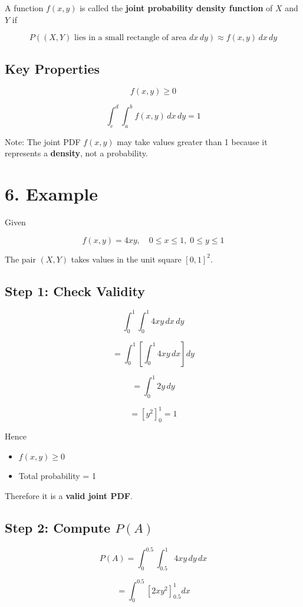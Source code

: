 \documentclass[12pt]{article}
\begin{document}
A function $f(x,y)$ is called the \textbf{joint probability density function} of $X$ and $Y$ if

\[
P((X,Y) \text{ lies in a small rectangle of area } dx\,dy)
\approx f(x,y)\,dx\,dy
\]

\subsection*{Key Properties}

\[
f(x,y) \ge 0
\]

\[
\int_c^d \int_a^b f(x,y)\,dx\,dy = 1
\]

Note: The joint PDF $f(x,y)$ may take values greater than 1 because it represents a \textbf{density}, not a probability.

\section*{6. Example}

Given

\[
f(x,y) = 4xy, \quad 0 \le x \le 1,\; 0 \le y \le 1
\]

The pair $(X,Y)$ takes values in the unit square $[0,1]^2$.

\subsection*{Step 1: Check Validity}

\[
\int_0^1 \int_0^1 4xy\,dx\,dy
\]

\[
= \int_0^1 \left[\int_0^1 4xy\,dx \right] dy
\]

\[
= \int_0^1 2y\,dy
\]

\[
= [y^2]_0^1 = 1
\]

Hence

\begin{itemize}
\item $f(x,y) \ge 0$
\item Total probability = 1
\end{itemize}

Therefore it is a \textbf{valid joint PDF}.

\subsection*{Step 2: Compute $P(A)$}

\[
P(A) =
\int_0^{0.5} \int_{0.5}^{1} 4xy\,dy\,dx
\]

\[
= \int_0^{0.5} [2xy^2]_{0.5}^{1} dx
\]
\end{document}
